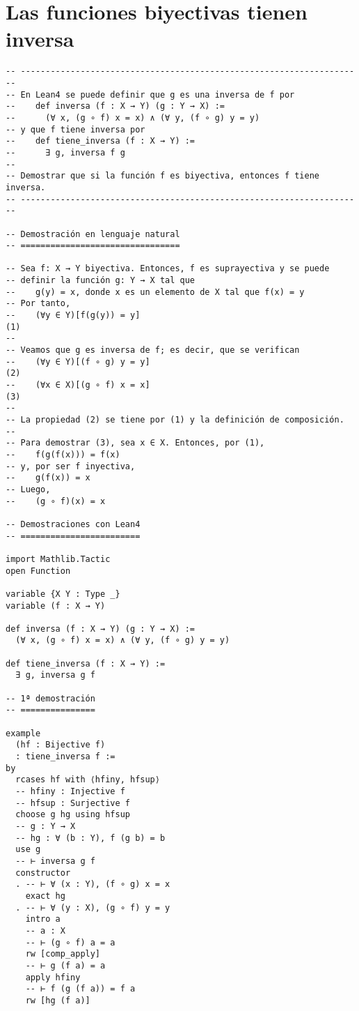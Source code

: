 \section{Las funciones biyectivas tienen inversa}
\label{sec:org3434957}
\begin{verbatim}
-- ---------------------------------------------------------------------
-- En Lean4 se puede definir que g es una inversa de f por
--    def inversa (f : X → Y) (g : Y → X) :=
--      (∀ x, (g ∘ f) x = x) ∧ (∀ y, (f ∘ g) y = y)
-- y que f tiene inversa por
--    def tiene_inversa (f : X → Y) :=
--      ∃ g, inversa f g
--
-- Demostrar que si la función f es biyectiva, entonces f tiene inversa.
-- ---------------------------------------------------------------------

-- Demostración en lenguaje natural
-- ================================

-- Sea f: X → Y biyectiva. Entonces, f es suprayectiva y se puede
-- definir la función g: Y → X tal que
--    g(y) = x, donde x es un elemento de X tal que f(x) = y
-- Por tanto,
--    (∀y ∈ Y)[f(g(y)) = y]                                          (1)
--
-- Veamos que g es inversa de f; es decir, que se verifican
--    (∀y ∈ Y)[(f ∘ g) y = y]                                        (2)
--    (∀x ∈ X)[(g ∘ f) x = x]                                        (3)
--
-- La propiedad (2) se tiene por (1) y la definición de composición.
--
-- Para demostrar (3), sea x ∈ X. Entonces, por (1),
--    f(g(f(x))) = f(x)
-- y, por ser f inyectiva,
--    g(f(x)) = x
-- Luego,
--    (g ∘ f)(x) = x

-- Demostraciones con Lean4
-- ========================

import Mathlib.Tactic
open Function

variable {X Y : Type _}
variable (f : X → Y)

def inversa (f : X → Y) (g : Y → X) :=
  (∀ x, (g ∘ f) x = x) ∧ (∀ y, (f ∘ g) y = y)

def tiene_inversa (f : X → Y) :=
  ∃ g, inversa g f

-- 1ª demostración
-- ===============

example
  (hf : Bijective f)
  : tiene_inversa f :=
by
  rcases hf with ⟨hfiny, hfsup⟩
  -- hfiny : Injective f
  -- hfsup : Surjective f
  choose g hg using hfsup
  -- g : Y → X
  -- hg : ∀ (b : Y), f (g b) = b
  use g
  -- ⊢ inversa g f
  constructor
  . -- ⊢ ∀ (x : Y), (f ∘ g) x = x
    exact hg
  . -- ⊢ ∀ (y : X), (g ∘ f) y = y
    intro a
    -- a : X
    -- ⊢ (g ∘ f) a = a
    rw [comp_apply]
    -- ⊢ g (f a) = a
    apply hfiny
    -- ⊢ f (g (f a)) = f a
    rw [hg (f a)]


\end{verbatim}
